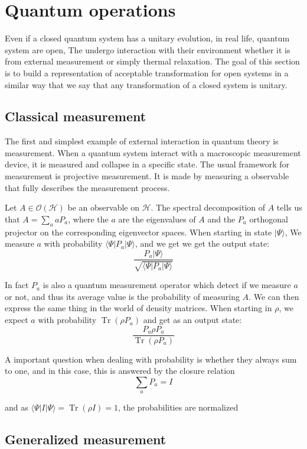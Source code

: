 \documentclass[10pt]{report}
\theoremstyle{plain}
\theoremstyle{definition}
\theoremstyle{remark}
\newcommand{\ket}[1]{|#1\rangle}
\newcommand{\bra}[1]{\langle#1|}
\DeclareMathOperator{\Tr}{Tr}
\begin{document}
\section{Quantum operations}

Even if a closed quantum system has a unitary evolution, in real life, quantum
system are open, The undergo interaction with their environment whether it is
from external measurement or simply thermal relaxation. The goal of this section
is to build a representation of acceptable transformation for open systems in a
similar way that we say that any transformation of a closed system is unitary.

\subsection{Classical measurement}

The first and simplest example of external interaction in quantum theory is
measurement. When a quantum system interact with a macroscopic measurement
device, it is measured and collapse in a specific state. The usual framework for
measurement is projective measurement. It is
made by measuring a observable that fully describes the measurement
process.

Let $A \in \mathcal{O}(\mathcal{H})$ be an observable on $\mathcal{H}$. The
spectral decomposition of $A$ tells us that $A = \sum_a a P_a$, where the $a$
are the eigenvalues of $A$ and the $P_a$ orthogonal projector on the
corresponding eigenvector spaces. When starting in state $\ket \Psi$, We
measure $a$ with probability $\bra \Psi P_a \ket \Psi$, and we get we get
the output state:
\[ \frac{P_a \ket \Psi}{\sqrt{\bra \Psi P_a \ket \Psi}}\]

In fact $P_a$ is also a quantum measurement operator which detect if we measure
$a$ or not, and thus its average value is the probability of measuring $A$. We
can then express the same thing in the world of density matrices. When starting in
$\rho$, we expect $a$ with probability $\Tr(\rho P_a)$ and get as an output
state:
\[ \frac{P_a \rho P_a}{\Tr(\rho P_a)}\]

A important question when dealing with probability is whether they always sum to
one, and in this case, this is answered by the closure relation
\[\sum_a P_a = I\]

and as $\bra \Psi I \ket \Psi = \Tr(\rho I) = 1$, the probabilities are normalized

\subsection{Generalized measurement}
\end{document}
